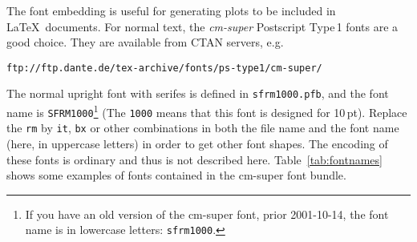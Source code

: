 \documentclass[a4paper,10pt]{article}
\begin{document}
The font embedding is useful for generating plots to be included in
\LaTeX\ documents. 
For normal text, the \emph{cm-super} Postscript Type\,1 fonts are a
good choice. 
They are available from CTAN servers, e.g.
\begin{verbatim}
ftp://ftp.dante.de/tex-archive/fonts/ps-type1/cm-super/
\end{verbatim}
The normal upright font with serifes is defined in
\verb|sfrm1000.pfb|, and the font name is \verb|SFRM1000|\footnote{If you
have an old version of the cm-super font, prior 2001-10-14, the font name is
in lowercase letters: \texttt{sfrm1000}.} (The
\verb|1000| means that this font is designed for 10\,pt).
Replace the \verb|rm| by \verb|it|, \verb|bx| or other combinations in
both the file name and the font name (here, in uppercase letters) in order 
to get other font shapes.
The encoding of these fonts is ordinary and thus is not described
here.
Table~\ref{tab:fontnames} shows some examples of fonts contained in
the cm-super font bundle.
%
\end{document}
